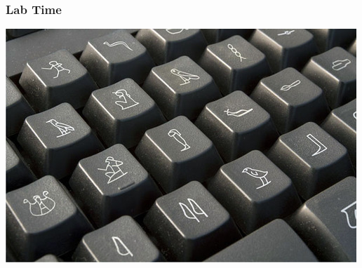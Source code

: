 \documentclass[11pt,compress,professionalfonts]{beamer}
\newcommand{\ita}{\begin{itemize}}
\newcommand{\itm}{\item[]}
\newcommand{\itz}{\end{itemize}}
\begin{document}
\begin{frame}[t]\frametitle{Lab Time}

\centerline{\includegraphics[scale=.8]{pictures/hieroglyphic-keyboard-cm}}


%
%
%
%
%
%
%
%






%
%
%
%
%
%
%
%
%
\end{frame}
\end{document}
